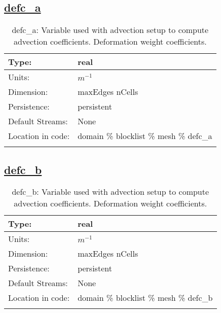 \subsection[defc\_a]{\hyperref[sec:var_tab_mesh]{defc\_a}}
\label{subsec:var_sec_mesh_defc_a}
\begin{center}
\begin{longtable}{| p{2.0in} | p{4.0in} |}
        \hline 
        Type: & real \\
        \hline 
        Units: & $m^{-1}$ \\
        \hline 
        Dimension: & maxEdges nCells \\
        \hline 
        Persistence: & persistent \\
        \hline 
		 Default Streams: & None \\
        \hline 
		 Location in code: & domain \% blocklist \% mesh \% defc\_a \\
		 \hline 
    \caption{defc\_a: Variable used with advection setup to compute advection coefficients. Deformation weight coefficients.}
\end{longtable}
\end{center}
\subsection[defc\_b]{\hyperref[sec:var_tab_mesh]{defc\_b}}
\label{subsec:var_sec_mesh_defc_b}
\begin{center}
\begin{longtable}{| p{2.0in} | p{4.0in} |}
        \hline 
        Type: & real \\
        \hline 
        Units: & $m^{-1}$ \\
        \hline 
        Dimension: & maxEdges nCells \\
        \hline 
        Persistence: & persistent \\
        \hline 
		 Default Streams: & None \\
        \hline 
		 Location in code: & domain \% blocklist \% mesh \% defc\_b \\
		 \hline 
    \caption{defc\_b: Variable used with advection setup to compute advection coefficients. Deformation weight coefficients.}
\end{longtable}
\end{center}
